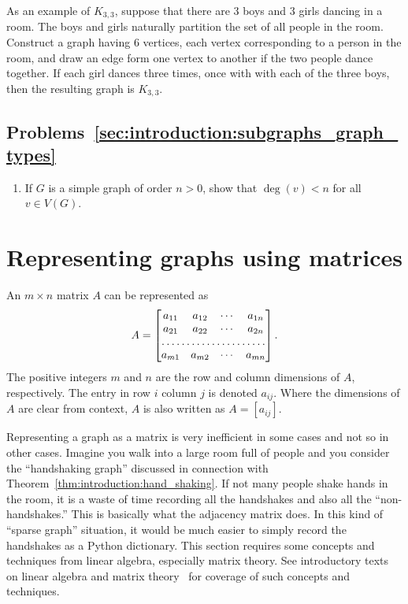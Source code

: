As an example of $K_{3,3}$, suppose that there are $3$ boys and $3$
girls dancing in a room. The boys and girls naturally partition the
set of all people in the room. Construct a graph having $6$ vertices,
each vertex corresponding to a person in the room, and draw an edge
form one vertex to another if the two people dance together. If each
girl dances three times, once with with each of the three boys, then
the resulting graph is $K_{3,3}$.


\subsection*{Problems~\ref{sec:introduction:subgraphs_graph_types}}

\begin{enumerate}
\item If $G$ is a simple graph of order $n > 0$, show that
  $\deg(v) < n$ for all $v \in V(G)$.
\end{enumerate}



\section{Representing graphs using matrices}
\label{sec:introduction:matrix_representation}

An $m \times n$ matrix $A$ can be represented as
\[
A
=
\begin{bmatrix}
a_{11} & a_{12} & \cdots & a_{1n} \\
a_{21} & a_{22} & \cdots & a_{2n} \\
\hdotsfor{4} \\
a_{m1} & a_{m2} & \cdots & a_{mn} \\
\end{bmatrix}.
\]
The positive integers $m$ and $n$ are the row and column dimensions of
$A$, respectively. The entry in row $i$ column $j$ is denoted
$a_{ij}$. Where the dimensions of $A$ are clear from context, $A$ is
also written as $A = [a_{ij}]$.

Representing a graph as a matrix is very inefficient in some cases and
not so in other cases. Imagine you walk into a large room full of
people and you consider the ``handshaking graph'' discussed in
connection with Theorem~\ref{thm:introduction:hand_shaking}. If not
many people shake hands in the room, it is a waste of time recording
all the handshakes and also all the ``non-handshakes.'' This is
basically what the adjacency matrix does. In this kind of
``sparse graph'' situation, it would be much easier to simply record
the handshakes as a Python dictionary. This section requires some
concepts and techniques from linear algebra, especially matrix
theory. See introductory texts on linear algebra and matrix
theory~\cite{Beezer2009} for coverage of such concepts and techniques.


